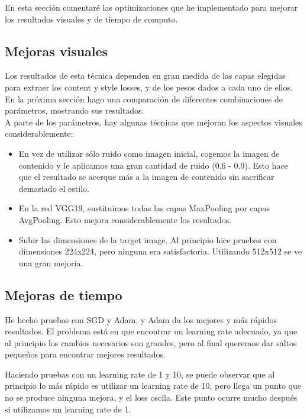 \documentclass[a4paper, 11pt]{article}
\begin{document}
    	En esta sección comentaré las optimizaciones que he implementado para mejorar los resultados visuales y de tiempo de computo.
    	
 	    	\subsection{Mejoras visuales}
   				Los resultados de esta técnica dependen en gran medida de las capas elegidas para extraer los content y style losses, y de los pesos dados a cada uno de ellos. En la próxima sección hago una comparación de diferentes combinaciones de parámetros, mostrando sus resultados.  \\
   				
   				A parte de los parámetros, hay algunas técnicas que mejoran los aspectos visuales considerablemente:
   				
   				\begin{itemize}
   					\item En vez de utilizar sólo ruido como imagen inicial, cogemos la imagen de contenido y le aplicamos una gran cantidad de ruido (0.6 - 0.9). Esto hace que el resultado se acerque más a la imagen de contenido sin sacrificar demasiado el estilo.
   					\item En la red VGG19, sustituimos todas las capas MaxPooling por capas AvgPooling. Esto mejora considerablemente los resultados.
   					\item Subir las dimensiones de la target image. Al principio hice pruebas con dimensiones 224x224, pero ninguna era satisfactoria. Utilizando 512x512 se ve una gran mejoría. 
   				\end{itemize}
   				
   			\subsection{Mejoras de tiempo}
   				He hecho pruebas con SGD y Adam, y Adam da los mejores y más rápidos resultados. El problema está en que encontrar un learning rate adecuado, ya que al principio los cambios necesarios son grandes, pero al final queremos dar saltos pequeños para encontrar mejores resultados. 
   				
   				Haciendo pruebas con un learning rate de 1 y 10, se puede observar que al principio lo más rápido es utilizar un learning rate de 10,  pero llega un punto que no se produce ninguna mejora, y el loss oscila. Este punto ocurre mucho después si utilizamos un learning rate de 1.
   				
\end{document}
